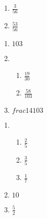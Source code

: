     \begin{enumerate}[noitemsep, label=\textbf{(\alph*)} ]
    \item$\frac{3}{56}$%
    \item $\frac{53}{56}$%
    \end{enumerate}
  \item %
    \begin{enumerate}[noitemsep, label=\textbf{(\alph*)} ]
    \item $103$ %
    \item %
      \begin{enumerate}
      \item $\frac{19}{30}$%
      \item $\frac{58}{103}$%
      \end{enumerate} 
    \item $frac{14}{103}$%
    \end{enumerate}
  \item %
    \begin{enumerate}[noitemsep, label=\textbf{(\alph*)} ]
\item %
      \begin{enumerate}
      \item $\frac{2}{5}$%
      \item $\frac{3}{5}$%
      \item $\frac{1}{7}$%
      \end{enumerate}
    \item $10$%
    \item$\frac{5}{2}$ %
    \end{enumerate}
